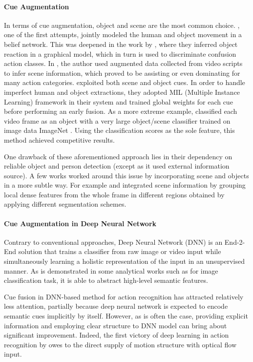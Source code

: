 \paragraph{Cue Augmentation} In terms of cue augmentation, object and scene are the most common choice. \cite{moore1999exploiting}, one of the first attempts, jointly modeled the human and object movement in a belief network. 
This was deepened in the work by \cite{gupta2007objects}, where they inferred object reaction in a graphical model, which in turn is used to discriminate confusion action classes. 
In \cite{marszalek2009actions}, the author used augmented data collected from video scripts to infer scene information, which proved to be assisting or even dominating for many action categories. 
\cite{ikizler2010object} exploited both scene and object cues.
In order to handle imperfect human and object extractions, they adopted MIL (Multiple Instance Learning) framework in their system and trained global weights for each cue before performing an early fusion. 
As a more extreme example, \cite{jain201515} classified each video frame as an object with a very large object/scene classifier trained on image data ImageNet \cite{ILSVRC15}. Using the classification scores as the sole feature, this method achieved competitive results.

One drawback of these aforementioned approach lies in their dependency on reliable object and person detection (except \cite{marszalek2009actions} as it used external information source).  A few works worked around this issue by incorporating scene and objects in a more subtle way. For example \cite{ullah2010improving} and \cite{reddy2013recognizing}  integrated scene information by grouping local dense features from the whole frame in different regions obtained by applying different segmentation schemes.

\paragraph{Cue Augmentation in Deep Neural Network} Contrary to conventional approaches, Deep Neural Network (DNN) is an End-2-End solution that trains a classifier from raw image or video input while simultaneously learning a holistic representation of the input in an unsupervised manner. As is demonstrated in some analytical works such as \cite{zeiler2014visualizing,mahendran2015understanding}for image classification task, it is able to abstract high-level semantic features.

Cue fusion in DNN-based method for action recognition has attracted relatively less attention, partially because deep neural network is expected to encode semantic cues implicitly by itself. 
However, as is often the case, providing explicit information and employing clear structure to DNN model can bring about significant improvement. Indeed, the first victory of deep learning in action recognition by \cite{simonyan2014two} owes to the direct supply of motion structure with optical flow input. 


